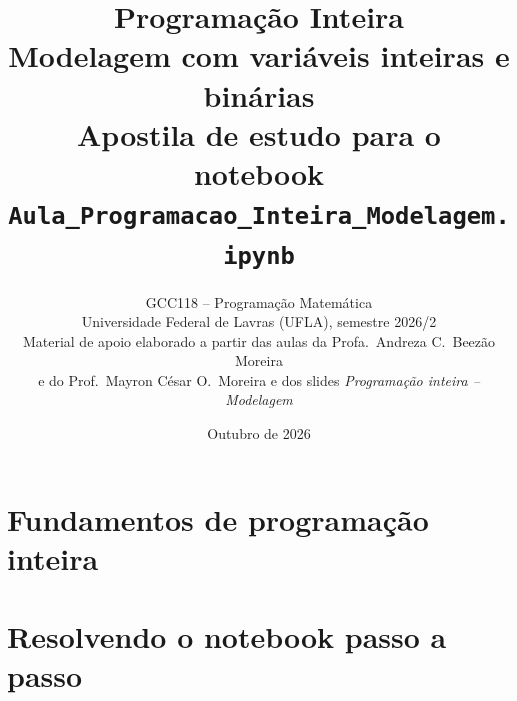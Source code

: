 \documentclass[11pt,a4paper,oneside]{report}
\title{%
  {\Huge\bfseries Programação Inteira}\\[6pt]
  {\Large Modelagem com variáveis inteiras e binárias}\\[14pt]
  {\large Apostila de estudo para o notebook\\ \texttt{Aula\_Programacao\_Inteira\_Modelagem.ipynb}}}
\author{GCC118 -- Programação Matemática\\
  \small Universidade Federal de Lavras (UFLA), semestre 2026/2\\[4pt]
  \small Material de apoio elaborado a partir das aulas da Profa.\ Andreza C.\ Beezão Moreira\\
  \small e do Prof.\ Mayron César O.\ Moreira e dos slides \emph{Programação inteira -- Modelagem}}
\date{Outubro de 2026}
\begin{document}
\hypersetup{pageanchor=false}
\maketitle
\hypersetup{pageanchor=true}
\tableofcontents

\clearpage
{}



\part{Fundamentos de programação inteira}






\part{Resolvendo o notebook passo a passo}










\appendix



\end{document}
